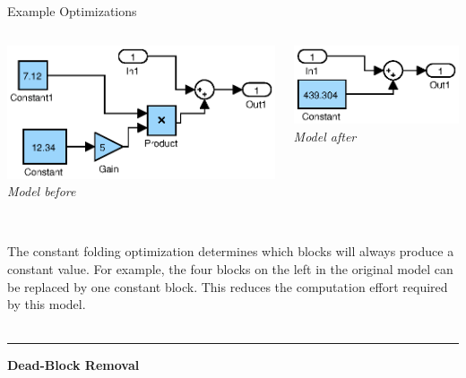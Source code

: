 \documentclass[final,hyperref={pdfpagelabels=false}]{beamer}
\begin{document}
\begin{frame}{}
\begin{columns}[t]
\begin{column}{.585\linewidth}
\begin{block}{Example Optimizations}
\begin{columns}[c]
\begin{column}{.485\linewidth}
\begin{center}
        \includegraphics[width=0.8\linewidth]{images/models/Const1}\\
        \footnotesize \textit{Model before}
        \end{center}
        \end{column}
        \begin{column}{.485\linewidth}
        \begin{center}
        \includegraphics[width=0.8\linewidth]{images/models/Const1_export}\\
        \footnotesize \textit{Model after}
        \end{center}
        \end{column}
        \end{columns}
        \footnotesize ~\\
        The constant folding optimization determines which blocks will always produce a constant value. For example, the four blocks on the left in the original model can be replaced by one constant block. This reduces the computation effort required by this model.
         ~\\~\\
         \hrule
         \small
          \begin{center}\textbf{Dead-Block Removal}\end{center}
                 
         \begin{columns}[c]
         \begin{column}{.485\linewidth}
         \begin{center}
         

\end{center}
\end{column}
\end{columns}
\end{block}
\end{column}
\end{columns}
\end{frame}
\end{document}
